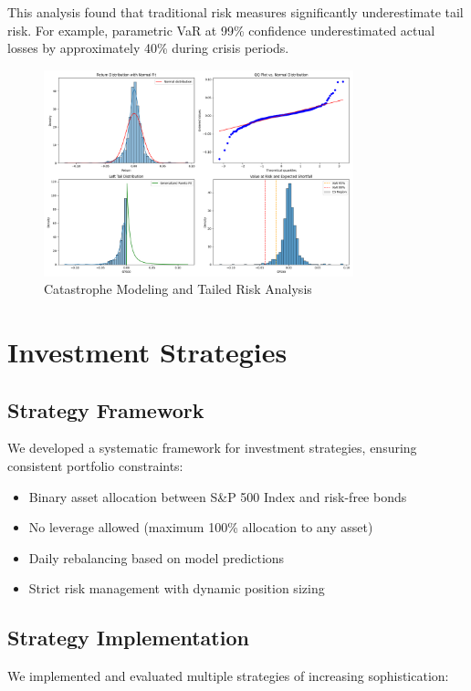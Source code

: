 \documentclass[13pt]{article}
\begin{document}
This analysis found that traditional risk measures significantly underestimate tail risk. For example, parametric VaR at 99\% confidence underestimated actual losses by approximately 40\% during crisis periods.
\begin{figure}[htbp]
	\centering
	\includegraphics[width=0.8\textwidth]{../results/catastrophe/tail_risk_analysis.png}
	\caption{Catastrophe Modeling and Tailed Risk Analysis}
	\label{fig:tailed_risk}
\end{figure}

\section{Investment Strategies}
\subsection{Strategy Framework}
We developed a systematic framework for investment strategies, ensuring consistent portfolio constraints:

\begin{itemize}
	\item Binary asset allocation between S\&P 500 Index and risk-free bonds
	\item No leverage allowed (maximum 100\% allocation to any asset)
	\item Daily rebalancing based on model predictions
	\item Strict risk management with dynamic position sizing
\end{itemize}

\subsection{Strategy Implementation}
We implemented and evaluated multiple strategies of increasing sophistication:
\end{document}
